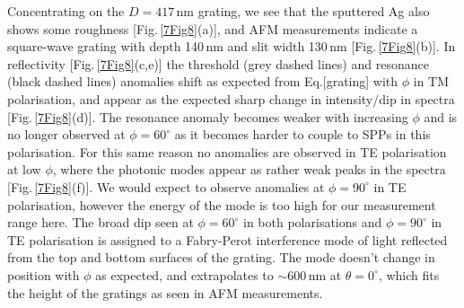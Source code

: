 Concentrating on the $D=417$\,nm grating, we see that the sputtered Ag also shows some roughness [Fig.\,\ref{7Fig8}(a)], and AFM measurements indicate a square-wave grating with depth 140\,nm and slit width 130\,nm [Fig.\,\ref{7Fig8}(b)]. In reflectivity [Fig.\,\ref{7Fig8}(c,e)] the threshold (grey dashed lines) and resonance (black dashed lines) anomalies shift as expected from Eq.[grating] with $\phi$ in TM polarisation, and appear as the expected sharp change in intensity/dip in spectra [Fig.\,\ref{7Fig8}(d)]. The resonance anomaly becomes weaker with increasing $\phi$ and is no longer observed at $\phi=60^{\circ}$ as it becomes harder to couple to SPPs in this polarisation. For this same reason no anomalies are observed in TE polarisation at low $\phi$, where the photonic modes appear as rather weak peaks in the spectra [Fig.\,\ref{7Fig8}(f)]. We would expect to observe anomalies at $\phi=90^{\circ}$ in TE polarisation, however the energy of the mode is too high for our measurement range here. The broad dip seen at $\phi=60^{\circ}$ in both polarisations and $\phi=90^{\circ}$ in TE polarisation is assigned to a Fabry-Perot interference mode of light reflected from the top and bottom surfaces of the grating. The mode doesn't change in position with $\phi$ as expected, and extrapolates to $\sim600$\,nm at $\theta=0^{\circ}$, which fits the height of the gratings as seen in AFM measurements.
